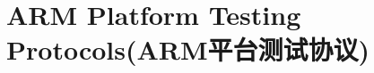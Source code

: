 \documentclass[a4paper, 11pt, UTF8]{ctexart}%
\begin{document}
%

\section{ARM Platform Testing Protocols(ARM平台测试协议)}
\end{document}

